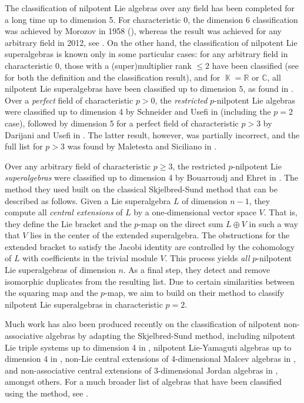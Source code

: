 \documentclass[12pt]{amsart}
\DeclareMathOperator{\K}{\mathbb{K}}
\begin{document}
The classification of nilpotent Lie algebras over any field has been completed
for a long time up to dimension 5. For characteristic 0, the dimension 6 classification was achieved by Morozov in 1958 (\cite{M}), whereas the result was achieved for any arbitrary field in 2012, see \cite{CGS,DG}. On the other hand, the classification of nilpotent Lie superalgebras is known only in some particular cases: for any arbitrary field in characteristic $0$, those with a (super)multiplier rank $\leq 2$ have been classified (see \cite{LZ} for both the definition and the classification result), and for $\K=\mathbb{R}$ or $\mathbb{C}$, all nilpotent Lie superalgebras have been classified up to dimension $5$, as found in \cite{H}. Over a \emph{perfect} field of characteristic $p>0$, the \emph{restricted} $p$-nilpotent Lie algebras were classified up to dimension 4 by Schneider and Usefi in \cite{SU} (including the $p=2$ case), followed by dimension 5 for a perfect field of characteristic $p>3$ by Darijani and Usefi in \cite{DU}. The latter result, however, was partially incorrect, and the full list for $p>3$ was found by Maletesta and Siciliano in \cite{MS}. 

Over any arbitrary field of characteristic $p\geq3$, the restricted $p$-nilpotent Lie \emph{superalgebras} were classified up to dimension 4 by Bouarroudj and Ehret in \cite{BE}. The method they used built on the classical Skjelbred-Sund method \cite{SS} that can be described as follows. Given a Lie superalgebra $L$ of dimension $n-1$, they compute all \textit{central extensions} of $L$ by a one-dimensional vector space $V$. That is, they define the Lie bracket and the $p$-map on the direct sum $L \oplus V$ in such a way that $V$ lies in the center of the extended superalgebra. The obstructions for the extended bracket to satisfy the Jacobi identity are controlled by the cohomology of $L$ with coefficients in the trivial module $V$. This process yields \textit{all} $p$-nilpotent Lie superalgebras of dimension $n$. As a final step, they detect and remove isomorphic duplicates from the resulting list. Due to certain similarities between the squaring map and the $p$-map, we aim to build on their method to classify nilpotent Lie superalgebras in characteristic $p=2$. 

Much work has also been produced recently on the classification of nilpotent non-associative algebras by adapting the Skjelbred-Sund method, including nilpotent Lie triple systems up to dimension 4 in \cite{ABCF1}, nilpotent Lie-Yamaguti algebras up to dimension 4 in \cite{ABCF2}, non-Lie central extensions of 4-dimensional Malcev algebras in \cite{HAC}, and non-associative central extensions of 3-dimensional Jordan algebras in \cite{HA}, amongst others. For a much broader list of algebras that have been classified using the method, see \cite{ABCF1}.
\end{document}
